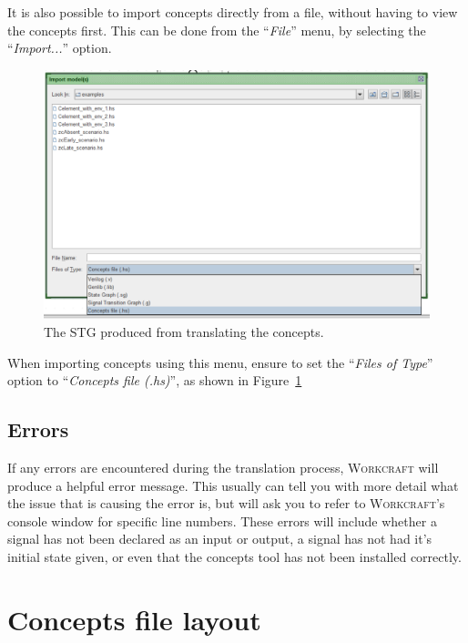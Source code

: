 \documentclass{proc}
\newcommand{\noun}[1]{\textsc{#1}}
\begin{document}
It is also possible to import concepts directly from a file, without having to view the concepts first. This can be done from the ``\emph{File}'' menu, by selecting the ``\emph{Import...}'' 
option. 

\begin{figure}[H]
\begin{centering}
\includegraphics[scale=0.4]{images/import_menu_screenshot}
\par\end{centering}

\begin{centering}
\protect\caption{\label{fig:import_menu_screenshot}The STG produced from translating the concepts.}

\par\end{centering}

\end{figure}

When importing concepts using this menu, ensure to set the ``\emph{Files of Type}'' option to ``\emph{Concepts file (.hs)}'', as shown in Figure~\ref{fig:import_menu_screenshot}

\subsection{Errors}

If any errors are encountered during the translation process, \noun{Workcraft} will produce a helpful error message. This usually can tell you with more detail what the issue that is causing 
the error is, but will ask you to refer to \noun{Workcraft}'s console window for specific line numbers. These errors will include whether a signal has not been declared as an input or output,
a signal has not had it's initial state given, or even that the concepts tool has not been installed correctly. 

\section{Concepts file layout \label{sec:concepts_layout}}

\newpage


\end{document}
